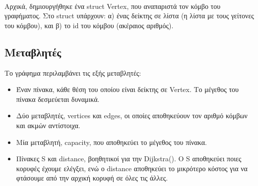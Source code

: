\documentclass[12pt,a4paper]{article}
\begin{document}
    \paragraph*{}
    Αρχικά, δημιουργήθηκε ένα struct Vertex, που αναπαριστά τον κόμβο του γραφήματος. 
    Στο struct υπάρχουν: α) ένας δείκτης σε λίστα (η λίστα με τους γείτονες του κόμβου), και β) το id του κόμβου (ακέραιος αριθμός). 
    \subsection*{Μεταβλητές}
    Το γράφημα περιλαμβάνει τις εξής μεταβλητές: 
    \begin{itemize}
        \item Έναν πίνακα, κάθε θέση του οποίου είναι δείκτης σε Vertex. Το μέγεθος του πίνακα δεσμεύεται δυναμικά.
        \item Δύο μεταβλητές, vertices και edges, οι οποίες αποθηκεύουν τον αριθμό κόμβων και ακμών αντίστοιχα. 
        \item Μία μεταβλητή, capacity, που αποθηκεύει το μέγεθος του πίνακα.
        \item Πίνακες S και distance, βοηθητικοί για την Dijkstra(). 
        Ο S αποθηκεύει ποιες κορυφές έχουμε ελέγξει, ενώ ο distance αποθηκεύει το μικρότερο κόστος για να φτάσουμε από την αρχική κορυφή σε όλες τις άλλες. 
    \end{itemize}
\end{document}
